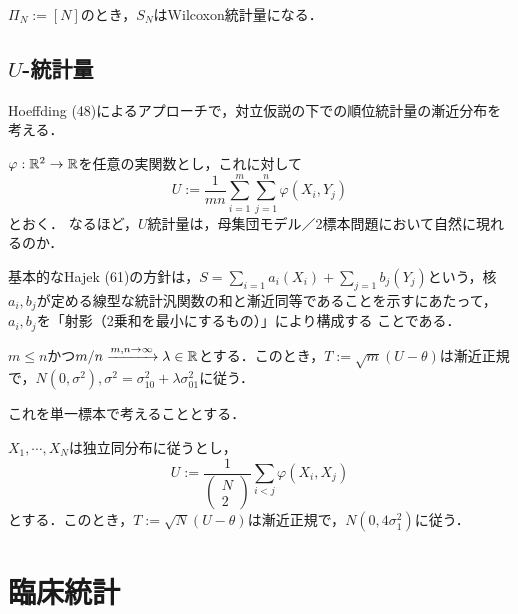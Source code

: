 \documentclass[uplatex,dvipdfmx]{jsreport}
\begin{document}
\begin{example}
    $\Pi_N:=[N]$のとき，$S_N$はWilcoxon統計量になる．
\end{example}

\section{$U$-統計量}

\begin{tcolorbox}[colframe=ForestGreen, colback=ForestGreen!10!white,breakable,colbacktitle=ForestGreen!40!white,coltitle=black,fonttitle=\bfseries\sffamily,
title=]
    Hoeffding (48)によるアプローチで，対立仮説の下での順位統計量の漸近分布を考える．
\end{tcolorbox}

\begin{notation}
    $\varphi:\mathbb{R}^2\to\mathbb{R}$を任意の実関数とし，これに対して
    \[U:=\frac{1}{mn}\sum^m_{i=1}\sum^n_{j=1}\varphi(X_i,Y_j)\]
    とおく．
    なるほど，$U$統計量は，母集団モデル／2標本問題において自然に現れるのか．
\end{notation}

\begin{remarks}
    基本的なHajek (61)の方針は，$S=\sum_{i=1}a_i(X_i)+\sum_{j=1}b_j(Y_j)$という，核$a_i,b_j$が定める線型な統計汎関数の和と漸近同等であることを示すにあたって，$a_i,b_j$を「射影（2乗和を最小にするもの）」により構成する
    ことである．
\end{remarks}

\begin{theorem}
    $m\le n$かつ$m/n\xrightarrow{m,n\to\infty}\lambda\in\mathbb{R}$とする．このとき，$T:=\sqrt{m}(U-\theta)$は漸近正規で，$N(0,\sigma^2),\sigma^2=\sigma_{10}^2+\lambda\sigma_{01}^2$に従う．
\end{theorem}

これを単一標本で考えることとする．

\begin{theorem}
    $X_1,\cdots,X_N$は独立同分布に従うとし，
    \[U:=\frac{1}{\begin{pmatrix}N\\2\end{pmatrix}}\sum_{i<j}\varphi(X_i,X_j)\]
    とする．このとき，$T:=\sqrt{N}(U-\theta)$は漸近正規で，$N(0,4\sigma_1^2)$に従う．
\end{theorem}



\chapter{臨床統計}
\end{document}
